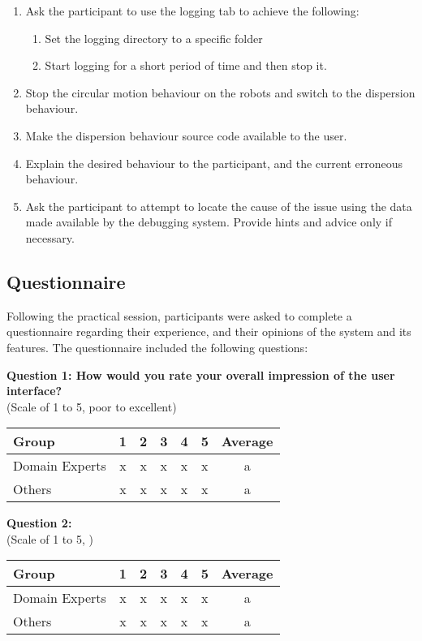 \begin{enumerate}
 \item Ask the participant to use the logging tab to achieve the following:
 \begin{enumerate}
  \item Set the logging directory to a specific folder
  \item Start logging for a short period of time and then stop it.
 \end{enumerate}
 \item Stop the circular motion behaviour on the robots and switch to the dispersion behaviour.
 \item Make the dispersion behaviour source code available to the user.
 \item Explain the desired behaviour to the participant, and the current erroneous behaviour.
 \item Ask the participant to attempt to locate the cause of the issue using the data made available by the debugging system. Provide hints and advice only if necessary.
\end{enumerate}

\subsection{Questionnaire}
Following the practical session, participants were asked to complete a questionnaire regarding their experience, and their opinions of the system and its features. The questionnaire included the following questions:

\noindent\textbf{Question 1: How would you rate your overall impression of the user interface?}\\(Scale of 1 to 5, poor to excellent)

\begin{center}
\begin{tabular}{ l c c c c c c }
 Group & 1 & 2 & 3 & 4 & 5 & Average \\ 
 \hline
 Domain Experts & x & x & x & x & x & a \\
 Others 		& x & x & x & x & x & a \\
\end{tabular}
\end{center}

\noindent\textbf{Question 2: }\\(Scale of 1 to 5, )

\begin{center}
\begin{tabular}{ l c c c c c c }
 Group & 1 & 2 & 3 & 4 & 5 & Average \\ 
 \hline
 Domain Experts & x & x & x & x & x & a \\
 Others 		& x & x & x & x & x & a \\
\end{tabular}
\end{center}

